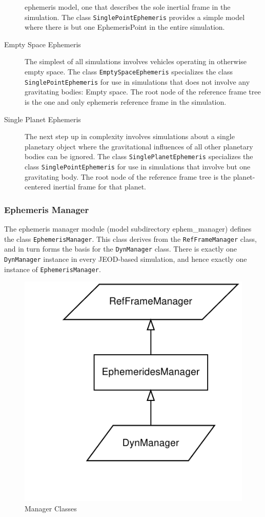 \begin{description}
ephemeris model, one that describes the sole inertial frame in the
simulation. The class \texttt{SinglePointEphemeris}
provides a simple model where there is but one EphemerisPoint in the entire
simulation.
\item[Empty Space Ephemeris] The simplest of all simulations
involves vehicles operating in otherwise empty space.
The class \texttt{EmptySpaceEphemeris}
specializes the class \texttt{SinglePointEphemeris} for use in
simulations that does not involve any gravitating bodies: Empty space.
The root node of the reference frame tree
is the one and only ephemeris reference frame in the simulation.
\item[Single Planet Ephemeris] The next step up in complexity involves
simulations about a single planetary object where the gravitational influences
of all other planetary bodies can be ignored.
The class \texttt{SinglePlanetEphemeris}
specializes the class \texttt{SinglePointEphemeris} for use in simulations that
involve but one gravitating body. The root node of the reference frame tree
is the planet-centered inertial frame for that planet.
\end{description}

\subsubsection{Ephemeris Manager}
The ephemeris manager module (model subdirectory ephem\_manager)
defines the class \texttt{EphemerisManager}. This class derives from the
\texttt{RefFrameManager} class, and in turn forms the basis for the
\texttt{DynManager} class. There is exactly one \texttt{DynManager} instance in
every JEOD-based simulation,
and hence exactly one instance of \texttt{EphemerisManager}.
\begin{figure}[hbtp]
\centering
\includegraphics{ephem_manager}
\caption{Manager Classes}
\label{fig:ephem_manager_classes}
\end{figure}

